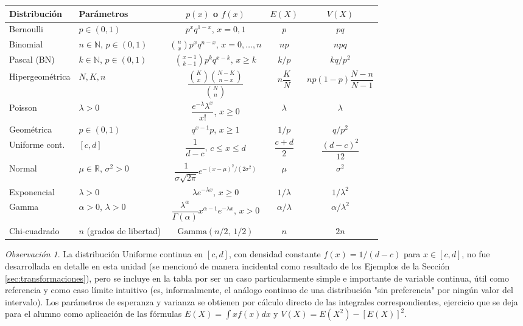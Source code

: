 \documentclass[11pt,a4paper]{article}
\theoremstyle{plain}
\theoremstyle{definition}
\theoremstyle{remark}
\newtheorem{observacion}[teorema]{Observación}
\begin{document}
\begin{center}
\small
\renewcommand{\arraystretch}{1.6}
\begin{tabular}{@{}llccc@{}}
\toprule
\textbf{Distribución} & \textbf{Parámetros} & \textbf{$p(x)$ o $f(x)$} & \textbf{$E(X)$} & \textbf{$V(X)$} \\
\midrule
Bernoulli & $p\in(0,1)$ & $p^xq^{1-x}$, $x=0,1$ & $p$ & $pq$ \\
Binomial & $n\in\mathbb{N}$, $p\in(0,1)$ & $\binom{n}{x}p^xq^{n-x}$, $x=0,\dots,n$ & $np$ & $npq$ \\
Pascal (BN) & $k\in\mathbb{N}$, $p\in(0,1)$ & $\binom{x-1}{k-1}p^kq^{x-k}$, $x\ge k$ & $k/p$ & $kq/p^2$ \\
Hipergeométrica & $N,K,n$ & $\dfrac{\binom{K}{x}\binom{N-K}{n-x}}{\binom{N}{n}}$ & $n\dfrac{K}{N}$ & $np(1-p)\dfrac{N-n}{N-1}$ \\
Poisson & $\lambda>0$ & $\dfrac{e^{-\lambda}\lambda^x}{x!}$, $x\ge0$ & $\lambda$ & $\lambda$ \\
Geométrica & $p\in(0,1)$ & $q^{x-1}p$, $x\ge1$ & $1/p$ & $q/p^2$ \\
Uniforme cont. & $[c,d]$ & $\dfrac{1}{d-c}$, $c\le x\le d$ & $\dfrac{c+d}{2}$ & $\dfrac{(d-c)^2}{12}$ \\
Normal & $\mu\in\mathbb{R}$, $\sigma^2>0$ & $\dfrac{1}{\sigma\sqrt{2\pi}}e^{-(x-\mu)^2/(2\sigma^2)}$ & $\mu$ & $\sigma^2$ \\
Exponencial & $\lambda>0$ & $\lambda e^{-\lambda x}$, $x\ge0$ & $1/\lambda$ & $1/\lambda^2$ \\
Gamma & $\alpha>0$, $\lambda>0$ & $\dfrac{\lambda^\alpha}{\Gamma(\alpha)}x^{\alpha-1}e^{-\lambda x}$, $x>0$ & $\alpha/\lambda$ & $\alpha/\lambda^2$ \\
Chi-cuadrado & $n$ (grados de libertad) & $\text{Gamma}(n/2,\,1/2)$ & $n$ & $2n$ \\
\bottomrule
\end{tabular}
\end{center}

\begin{observacion}
La distribución Uniforme continua en $[c,d]$, con densidad constante $f(x)=1/(d-c)$ para $x\in[c,d]$, no fue desarrollada en detalle en esta unidad (se mencionó de manera incidental como resultado de los Ejemplos de la Sección \ref{sec:transformaciones}), pero se incluye en la tabla por ser un caso particularmente simple e importante de variable continua, útil como referencia y como caso límite intuitivo (es, informalmente, el análogo continuo de una distribución "sin preferencia" por ningún valor del intervalo). Los parámetros de esperanza y varianza se obtienen por cálculo directo de las integrales correspondientes, ejercicio que se deja para el alumno como aplicación de las fórmulas $E(X)=\int xf(x)dx$ y $V(X)=E(X^2)-[E(X)]^2$.
\end{observacion}
\end{document}
